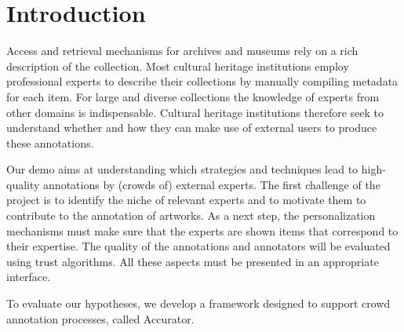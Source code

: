\section{Introduction}\label{introduction}
Access and retrieval mechanisms for archives and museums rely on a rich description of the collection. 
Most cultural heritage institutions employ professional experts to describe their collections by manually compiling metadata for each item. 
For large and diverse collections the knowledge of experts from other domains is indispensable.
Cultural heritage institutions therefore seek to understand whether and how they can make use of external users to produce these annotations.

Our demo aims at understanding which strategies and techniques lead to high-quality annotations by (crowds of) external experts. 
The first challenge of the project is to identify the niche of relevant experts and to motivate them to contribute to the annotation of artworks. 
As a next step, the personalization mechanisms must make sure that the experts are shown items that correspond to their expertise. 
The quality of the annotations and annotators will be evaluated using trust algorithms. 
All these aspects must be presented in an appropriate interface.

To evaluate our hypotheses, we develop a framework designed to support crowd annotation processes, called Accurator. 
